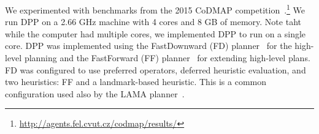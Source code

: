 \documentclass[letterpaper]{article}
\theoremstyle{definition}
\begin{document}
We experimented with benchmarks from the 2015 CoDMAP competition~\cite{vstolba2015competition}.\footnote{\url{http://agents.fel.cvut.cz/codmap/results/}}
We run DPP on a 2.66 GHz machine with 4 cores and 8 GB of memory. Note taht while the computer had multiple cores, we implemented DPP to run on a single core. DPP was
implemented using the FastDownward (FD) planner~\cite{helmert2006fast} for the high-level planning and the FastForward (FF) planner~\cite{hoffmann2001ff} for extending high-level plans. FD was configured to use preferred operators, deferred heuristic evaluation, and two heuristics: FF and a landmark-based heuristic. This is a common configuration used also by the LAMA planner~\cite{richter2010lama}.




\end{document}
